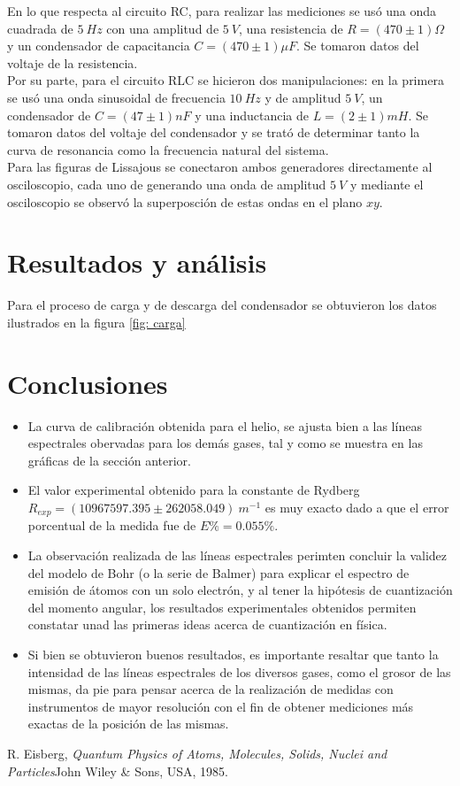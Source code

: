\documentclass[prb,aps,twocolumn,preprintnumbers,amsmath,amssymb]{revtex4}
\begin{document}
En lo que respecta al circuito RC, para realizar las mediciones se usó una onda cuadrada de $5\ Hz$ con una amplitud de $5\ V$, una resistencia de $R = (470 \pm 1)\Omega$ y un condensador de capacitancia $C = (470 \pm 1)\mu F$. Se tomaron datos del voltaje de la resistencia.\\

Por su parte, para el circuito RLC se hicieron dos manipulaciones: en la primera se usó una onda sinusoidal de frecuencia $10\ Hz$ y de amplitud $5\ V$, un condensador de $C = (47 \pm 1)nF$ y una inductancia de $L = (2 \pm 1)mH$. Se tomaron datos del voltaje del condensador y se trató de determinar tanto la curva de resonancia como la frecuencia natural del sistema.\\

Para las figuras de Lissajous se conectaron ambos generadores directamente al osciloscopio, cada uno de generando una onda de amplitud $5\ V$ y mediante el osciloscopio se observó la superposción de estas ondas en el plano $xy$.

\section{Resultados y análisis}

Para el proceso de carga y de descarga del condensador se obtuvieron los datos ilustrados en la figura \ref{fig: carga}




\section{Conclusiones}

\begin{itemize}

	\item La curva de calibración obtenida para el helio, se ajusta bien a las líneas espectrales obervadas para los demás gases, tal y como se muestra en las gráficas de la sección anterior.
	
	\item El valor experimental obtenido para la constante de Rydberg $R_{exp} = (10967597.395 \pm 262058.049)\ m^{-1}$ es muy exacto dado a que el error porcentual de la medida fue de $E\% = 0.055\%$.
		
	\item La observación realizada de las líneas espectrales perimten concluir la validez del modelo de Bohr (o la serie de Balmer) para explicar el espectro de emisión de átomos con un solo electrón, y al tener la hipótesis de cuantización del momento angular, los resultados experimentales obtenidos permiten constatar unad las primeras ideas acerca de cuantización en física.
	
	\item Si bien se obtuvieron buenos resultados, es importante resaltar que tanto la intensidad de las líneas espectrales de los diversos gases, como el grosor de las mismas, da pie para pensar acerca de la realización de medidas con instrumentos de mayor resolución con el fin de obtener mediciones más exactas de la posición de las mismas.
	
\end{itemize}

\begin{thebibliography}{99}
 R. Eisberg, {\it Quantum Physics of Atoms, Molecules, Solids, Nuclei and Particles}{John Wiley \& Sons, USA, 1985}.\\
\end{thebibliography}
\end{document}
